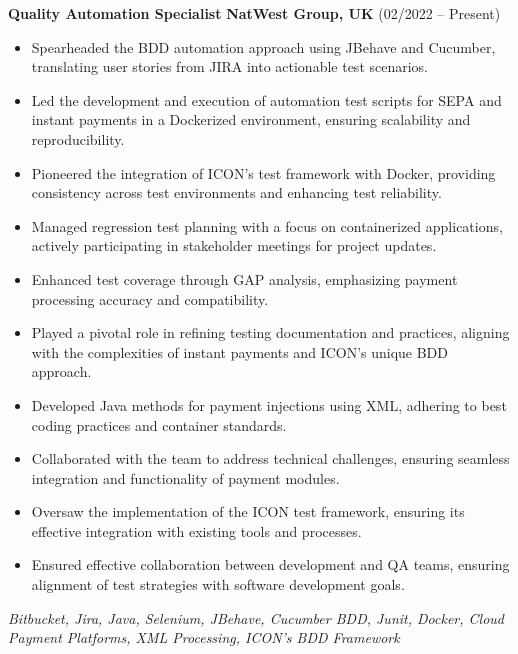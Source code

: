 \documentclass[11pt,a4paper]{article}
\begin{document}
    \noindent \textbf{Quality Automation Specialist} \hfill \textbf{NatWest Group, UK}  (02/2022 – Present) \\
    \begin{itemize}
        \item Spearheaded the BDD automation approach using JBehave and Cucumber, translating user stories from JIRA into actionable test scenarios.
        \item Led the development and execution of automation test scripts for SEPA and instant payments in a Dockerized environment, ensuring scalability and reproducibility.
        \item Pioneered the integration of ICON's test framework with Docker, providing consistency across test environments and enhancing test reliability.
        \item Managed regression test planning with a focus on containerized applications, actively participating in stakeholder meetings for project updates.
        \item Enhanced test coverage through GAP analysis, emphasizing payment processing accuracy and compatibility.
        \item Played a pivotal role in refining testing documentation and practices, aligning with the complexities of instant payments and ICON's unique BDD approach.
        \item Developed Java methods for payment injections using XML, adhering to best coding practices and container standards.
        \item Collaborated with the team to address technical challenges, ensuring seamless integration and functionality of payment modules.
        \item Oversaw the implementation of the ICON test framework, ensuring its effective integration with existing tools and processes.
        \item Ensured effective collaboration between development and QA teams, ensuring alignment of test strategies with software development goals.
    \end{itemize}
    \small \textit{Bitbucket, Jira, Java, Selenium, JBehave, Cucumber BDD, Junit, Docker, Cloud Payment Platforms, XML Processing, ICON's BDD Framework}
\end{document}
